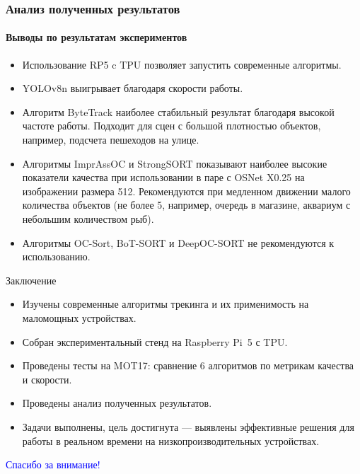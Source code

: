 \documentclass{beamer} %
\begin{document}
\begin{frame}
  \frametitle{Анализ полученных результатов}
  \framesubtitle{Выводы по результатам экспериментов}
  \begin{itemize}
    \item Использование RP5 c TPU позволяет запустить современные алгоритмы.
    \item YOLOv8n выигрывает благодаря скорости работы.
    \item Алгоритм ByteTrack наиболее стабильный результат благодаря высокой частоте работы. Подходит для сцен с большой плотностью объектов, например, подсчета пешеходов на улице.
    \item Алгоритмы ImprAssOC и StrongSORT показывают наиболее высокие показатели качества при использовании в паре с OSNet X0.25 на изображении размера 512. Рекомендуются при медленном движении малого количества объектов (не более 5, например, очередь в магазине, аквариум с небольшим количеством рыб).
    \item Алгоритмы OC-Sort, BoT-SORT и DeepOC-SORT не рекомендуются к использованию.
  \end{itemize}
\end{frame}

\begin{frame}{Заключение}
  \begin{itemize}
    \item Изучены современные алгоритмы трекинга и их применимость на маломощных устройствах.
    \item Собран экспериментальный стенд на Raspberry Pi 5 с TPU.
    \item Проведены тесты на MOT17: сравнение 6 алгоритмов по метрикам качества и скорости.
    \item Проведены анализ полученных результатов.
    \item Задачи выполнены, цель достигнута — выявлены эффективные решения для работы в реальном времени на низкопроизводительных устройствах.
  \end{itemize}
\end{frame}


\begin{frame}
  \centering \Huge \textcolor{blue}{Спасибо за внимание!}
\end{frame}
\end{document}
